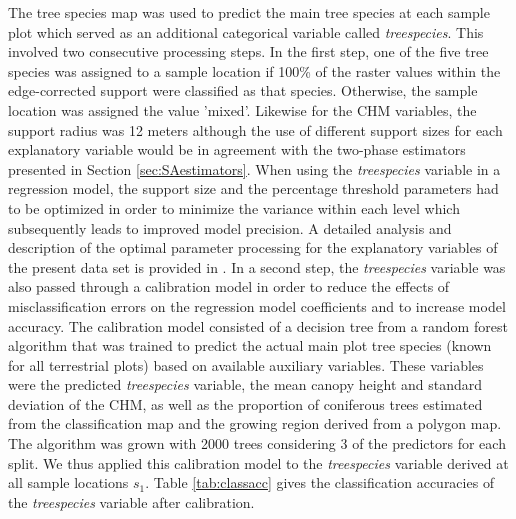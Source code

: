 The tree species map was used to predict the main tree species at each sample plot which served as an additional categorical variable called \textit{treespecies}. This involved two consecutive processing steps. In the first step, one of the five tree species was assigned to a sample location if 100\% of the raster values within the edge-corrected support were classified as that species. Otherwise, the sample location was assigned the value 'mixed'. Likewise for the CHM variables, the support radius was 12 meters although the use of different support sizes for each explanatory variable would be in agreement with the two-phase estimators presented in Section \ref{sec:SAestimators}. When using the \textit{treespecies} variable in a regression model, the support size and the percentage threshold parameters had to be optimized in order to minimize the variance within each level which subsequently leads to improved model precision. A detailed analysis and description of the optimal parameter processing for the explanatory variables of the present data set is provided in \citet{hill2017a}. In a second step, the \textit{treespecies} variable was also passed through a calibration model in order to reduce the effects of misclassification errors on the regression model coefficients and to increase model accuracy. The calibration model consisted of a decision tree from a random forest algorithm \citep{breiman2001} that was trained to predict the actual main plot tree species (known for all terrestrial plots) based on available auxiliary variables. These variables were the predicted \textit{treespecies} variable, the mean canopy height and standard deviation of the CHM, as well as the proportion of coniferous trees estimated from the classification map and the growing region derived from a polygon map. The algorithm was grown with 2000 trees considering 3 of the predictors for each split. We thus applied this calibration model to the \textit{treespecies} variable derived at all sample locations $s_1$. Table \ref{tab:classacc} gives the classification accuracies \citep{congalton2008} of the \textit{treespecies} variable after calibration.


